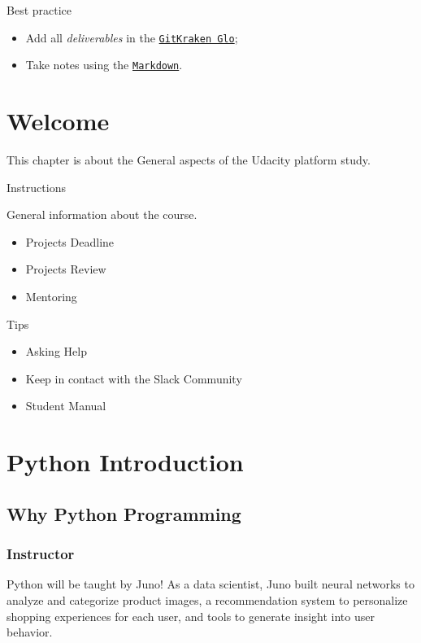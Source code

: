 \documentclass[]{book}
\providecommand{\tightlist}{%
  \setlength{\itemsep}{0pt}\setlength{\parskip}{0pt}}
\begin{document}
Best practice

\begin{itemize}
\tightlist
\item
  Add all \emph{deliverables} in the
  \href{https://www.gitkraken.com/invite/5Ua2spL4}{\texttt{GitKraken\ Glo}};
\item
  Take notes using the
  \href{https://github.com/adam-p/markdown-here/wiki/Markdown-Cheatsheet}{\texttt{Markdown}}.
\end{itemize}

\chapter{Welcome}\label{intro}

This chapter is about the General aspects of the Udacity platform study.

Instructions

General information about the course.

\begin{itemize}
\tightlist
\item
  Projects Deadline
\item
  Projects Review
\item
  Mentoring
\end{itemize}

Tips

\begin{itemize}
\tightlist
\item
  Asking Help
\item
  Keep in contact with the Slack Community
\item
  Student Manual
\end{itemize}

\chapter{Python Introduction}\label{python-introduction}

\section{Why Python Programming}\label{why-python-programming}

\subsection{Instructor}\label{instructor}

Python will be taught by Juno! As a data scientist, Juno built neural
networks to analyze and categorize product images, a recommendation
system to personalize shopping experiences for each user, and tools to
generate insight into user behavior.
\end{document}
